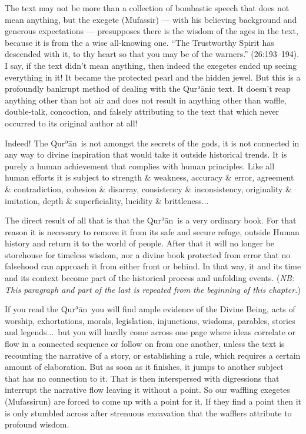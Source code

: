 \documentclass[12pt]{memoir}
\def\´{ʾ} %
\def \Quran{Qur\-\´ān} %
\newcommand{\QRef}[1]{{\color{darkblue}#1}}
\newcommand{\NB}[1]{\emph{\small NB: #1}}
\begin{document}
The text may not be more than a collection of bombastic speech
that does not mean anything, but the exegete (Mufassir) —
with his believing background and generous expectations —
presupposes there is the wisdom of the ages in the text,
because it is from the a wise all-knowing one.
“The Trustworthy Spirit has descended with it,
to thy heart so that you may be of the warners.” (\QRef{26:193–194}).
I say, if the text didn’t mean anything,
then indeed the exegetes ended up seeing everything in it!
It became the protected pearl and the hidden jewel.
But this is a profoundly bankrupt method of dealing with the \Quran{}ic text.
It doesn’t reap anything other than hot air and does not result
in anything other than waffle, double-talk, concoction,
and falsely attributing to the text that
which never occurred to its original author at all!

Indeed! The \Quran\ is not amongst the secrets of the gods,
it is not connected in any way to divine inspiration
that would take it outside historical trends.
It is purely a human achievement that complies with human principles.
Like all human efforts it is subject to strength \& weakness,
accuracy \& error, agreement \& contradiction, cohesion \& disarray,
consistency \& inconsistency, originality \& imitation,
depth \& superficiality, lucidity \& brittleness...

The direct result of all that is that the \Quran\ is a very ordinary book.
For that reason it is necessary to remove it from its safe and secure refuge,
outside Human history and return it to the world of people.
After that it will no longer be storehouse for timeless wisdom,
nor a divine book protected from error that no falsehood
can approach it from either front or behind.
In that way, it and its time and its context become
part of the historical process and unfolding events.
(\NB{This paragraph and part of the last is repeated
from the beginning of this chapter.})

If you read the \Quran\ you will find ample evidence of the Divine Being,
acts of worship, exhortations, morals, legislation, injunctions, wisdoms,
parables, stories and legends...\ but you will hardly come across one page
where ideas correlate or flow in a connected sequence
or follow on from one another,
unless the text is recounting the narrative of a story,
or establishing a rule, which requires a certain amount of elaboration.
But as soon as it finishes, it jumps to another subject
that has no connection to it.
That is then interspersed with digressions that
interrupt the narrative flow leaving it without a point.
So our waffling exegetes (Mufassirun) are forced
to come up with a point for it.
If they find a point then it is only stumbled across after
strenuous excavation that the wafflers attribute to profound wisdom.
\end{document}

